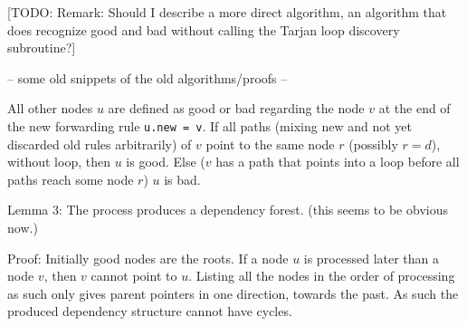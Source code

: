 [TODO: Remark: Should I describe a more direct algorithm, an algorithm that does recognize good and bad without calling the Tarjan loop discovery subroutine?]

-- some old snippets of the old algorithms/proofs --

All other nodes $u$ are defined as good or bad regarding the node $v$ at the end of the new forwarding rule \texttt{u.new = v}. If all paths (mixing new and not yet discarded old rules arbitrarily) of $v$ point to the same node $r$ (possibly $r = d$), without loop, then $u$ is good. Else ($v$ has a path that points into a loop before all paths reach some node $r$) $u$ is bad.

Lemma 3: The process produces a dependency forest. (this seems to be obvious now.)

Proof: Initially good nodes are the roots. If a node $u$ is processed later than a node $v$, then $v$ cannot point to $u$. Listing all the nodes in the order of processing as such only gives parent pointers in one direction, towards the past. As such the produced dependency structure cannot have cycles.
